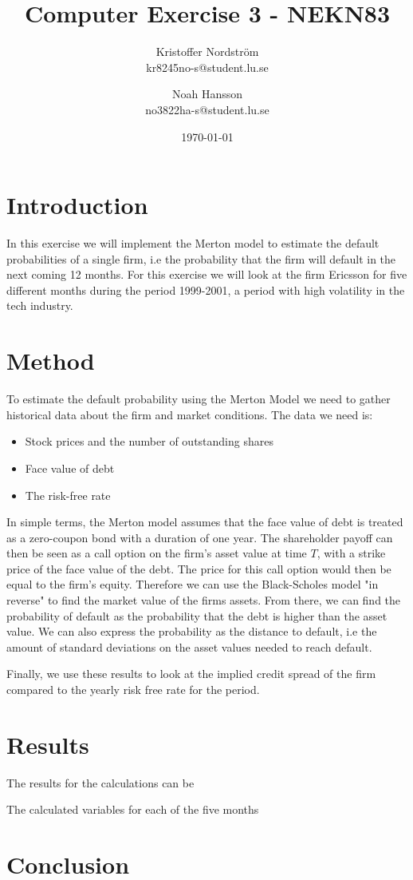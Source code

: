 \documentclass[a4paper]{article}
\title{Computer Exercise 3 - NEKN83}
\author{Kristoffer Nordström \\ kr8245no-s@student.lu.se \and  Noah Hansson \\ no3822ha-s@student.lu.se}
\date{\today}
\begin{document}
\maketitle

\section{Introduction}
In this exercise we will implement the Merton model to estimate the default probabilities of a single firm, i.e the probability that the firm will default in the next coming 12 months. For this exercise we will look at the firm Ericsson for five different months during the period 1999-2001, a period with high volatility in the tech industry.

\section{Method}
To estimate the default probability using the Merton Model we need to gather historical data about the firm and market conditions. The data we need is:
\begin{itemize}
    \item Stock prices and the number of outstanding shares
    \item Face value of debt
    \item The risk-free rate
\end{itemize}

In simple terms, the Merton model assumes that the face value of debt is treated as a zero-coupon bond with a duration of one year. The shareholder payoff can then be seen as a call option on the firm's asset value at time $T$, with a strike price of the face value of the debt. The price for this call option would then be equal to the firm's equity. Therefore we can use the Black-Scholes model "in reverse" to find the market value of the firms assets. From there, we can find the probability of default as the probability that the debt is higher than the asset value. We can also express the probability as the distance to default, i.e the amount of standard deviations on the asset values needed to reach default.

Finally, we use these results to look at the implied credit spread of the firm compared to the yearly risk free rate for the period.

\section{Results}

The results for the calculations can be 
\begin{table}[H]
    \centering
    \caption{The calculated variables for each of the five months}
    \label{tab:result}
    
\end{table}

\section{Conclusion}
\end{document}
